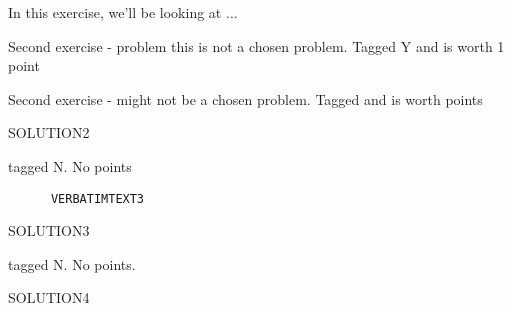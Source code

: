 \begin{intro}
	In this exercise, we'll be looking at \( \dots \)
\end{intro}
\begin{problem}
  Second exercise - problem this is not a chosen problem. Tagged Y and is worth 1 point
\end{problem}
\begin{problem}
  Second exercise - might not be a chosen problem. \makeatletter Tagged \exb@currentTag and is worth \exb@currentPoints points\makeatother
\end{problem}
\begin{solution}
	SOLUTION2
\end{solution}
\begin{problem}
  \lipsum[1] tagged N. No points
\begin{verbatim}
      VERBATIMTEXT3
  \end{verbatim}
\end{problem}
\begin{solution}
	SOLUTION3
\end{solution}
\begin{problem}
\lipsum[2-3] tagged N. No points.
\end{problem}
\begin{solution}
	SOLUTION4
\end{solution}
\begin{problem}
\lipsum[4]
\end{problem}
